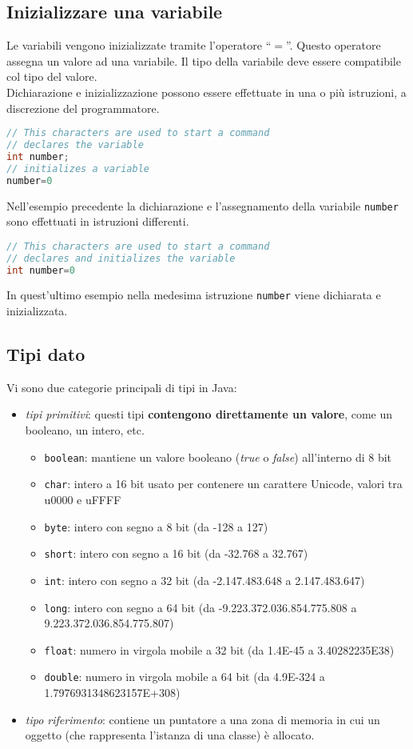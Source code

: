 \documentclass{article}
\begin{document}
\subsection{Inizializzare una variabile}
Le variabili vengono inizializzate tramite l'operatore ``$=$''. Questo operatore assegna un valore ad una variabile.
Il tipo della variabile deve essere compatibile col tipo del valore.\\
Dichiarazione e inizializzazione possono essere effettuate in una o  più istruzioni, a discrezione
del programmatore.
\begin{lstlisting}[language=Java,escapechar=|]
// This characters are used to start a command
// declares the variable
int number;
// initializes a variable
number=0
\end{lstlisting}
Nell'esempio precedente la dichiarazione e l'assegnamento della variabile \texttt{number} sono
effettuati in istruzioni differenti.
\begin{lstlisting}[language=Java,escapechar=|]
// This characters are used to start a command
// declares and initializes the variable
int number=0
\end{lstlisting}
In quest'ultimo esempio nella medesima istruzione \texttt{number} viene dichiarata e inizializzata.

\subsection{Tipi dato}
Vi sono due categorie principali di tipi in Java:
\begin{itemize}
\item \emph{tipi primitivi}: questi tipi \textbf{contengono direttamente un valore}, come un booleano,
un intero, etc.
\begin{itemize}
\item \texttt{boolean}: mantiene un valore booleano (\emph{true} o \emph{false}) all'interno di 8 bit
\item \texttt{char}: intero a 16 bit usato per contenere un carattere Unicode, valori tra u0000 e uFFFF
\item \texttt{byte}: intero con segno a 8 bit (da -128 a 127)
\item \texttt{short}: intero con segno a 16 bit (da -32.768 a 32.767)
\item \texttt{int}: intero con segno a 32 bit (da -2.147.483.648 a 2.147.483.647)
\item \texttt{long}: intero con segno a 64 bit (da -9.223.372.036.854.775.808 a 9.223.372.036.854.775.807)
\item \texttt{float}: numero in virgola mobile a 32 bit (da 1.4E-45 a 3.40282235E38)
\item \texttt{double}: numero in virgola mobile a 64 bit (da 4.9E-324 a 1.7976931348623157E+308)
\end{itemize}
\item \emph{tipo riferimento}: contiene un puntatore a una zona di memoria in cui un oggetto
(che rappresenta l'istanza di una classe) è allocato. 
\end{itemize}
\end{document}
